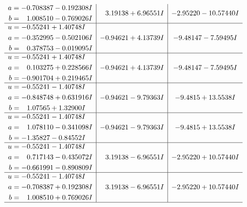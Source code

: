 \documentclass[1p]{elsarticle_modified}
\theoremstyle{definition}
\begin{document}
$$\begin{array}{c|c|c}
\begin{aligned}
a &= -0.708387 - 0.192308 I \\
b &= \phantom{-}1.008510 - 0.769026 I\end{aligned}
 & \phantom{-}3.19138 + 6.96551 I & -2.95220 - 10.57440 I \\ \hline\begin{aligned}
u &= -0.55241 + 1.40748 I \\
a &= -0.352995 - 0.502106 I \\
b &= \phantom{-}0.378753 - 0.019095 I\end{aligned}
 & -0.94621 + 4.13739 I & -9.48147 - 7.59495 I \\ \hline\begin{aligned}
u &= -0.55241 + 1.40748 I \\
a &= \phantom{-}0.103275 + 0.228566 I \\
b &= -0.901704 + 0.219465 I\end{aligned}
 & -0.94621 + 4.13739 I & -9.48147 - 7.59495 I \\ \hline\begin{aligned}
u &= -0.55241 - 1.40748 I \\
a &= -0.848748 + 0.631916 I \\
b &= \phantom{-}1.07565 + 1.32900 I\end{aligned}
 & -0.94621 - 9.79363 I & -9.4815 + 13.5538 I \\ \hline\begin{aligned}
u &= -0.55241 - 1.40748 I \\
a &= \phantom{-}1.078110 - 0.341098 I \\
b &= -1.35827 - 0.84552 I\end{aligned}
 & -0.94621 - 9.79363 I & -9.4815 + 13.5538 I \\ \hline\begin{aligned}
u &= -0.55241 - 1.40748 I \\
a &= \phantom{-}0.717143 - 0.435072 I \\
b &= -0.661991 - 0.890809 I\end{aligned}
 & \phantom{-}3.19138 - 6.96551 I & -2.95220 + 10.57440 I \\ \hline\begin{aligned}
u &= -0.55241 - 1.40748 I \\
a &= -0.708387 + 0.192308 I \\
b &= \phantom{-}1.008510 + 0.769026 I\end{aligned}
 & \phantom{-}3.19138 - 6.96551 I & -2.95220 + 10.57440 I\\
 \hline 
 \end{array}$$\newpage$$\begin{array}{c|c|c}  

\end{array}$$
\end{document}
